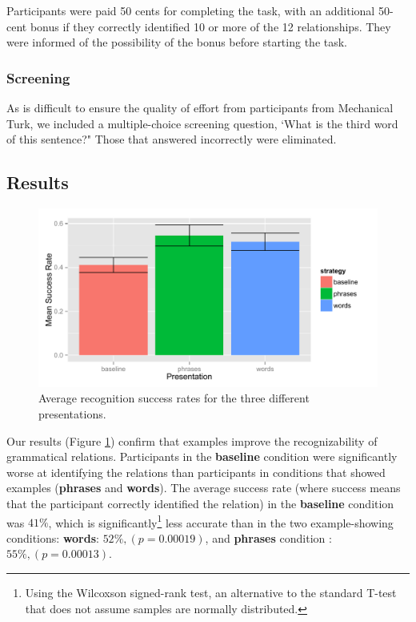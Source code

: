 \documentclass{sigchi}
\newcommand{\strong}[1] {\textbf{#1}}
\begin{document}
Participants were paid 50 cents for completing the task, with an additional 50-cent bonus if they correctly identified 10 or more of the 12 relationships. They were informed of the possibility of the bonus before starting the task.

\subsubsection{Screening}

As is difficult to ensure the quality of effort from participants from Mechanical Turk, we included a multiple-choice screening question, `What is the third word of this sentence?"  Those that answered incorrectly were eliminated.


\subsection{Results}
\begin{figure}
\includegraphics[width=1.0\columnwidth]{fig/overall-success-rates}
\caption{
	\label{fig:overall-success-rates} Average recognition success rates for the three different presentations.
}
\end{figure}
Our results (Figure \ref{fig:overall-success-rates}) confirm that examples improve the recognizability of grammatical relations. Participants in the \strong{baseline} condition were significantly worse at identifying the relations than participants in conditions that showed examples (\strong{phrases} and \strong{words}).  The average success rate (where success means that the participant correctly identified the relation) in the \strong{baseline} condition was $41\%$, which is significantly\footnote{Using the Wilcoxson signed-rank test, an alternative to the standard T-test that does not assume samples are normally distributed.} less accurate than in the two example-showing conditions: \strong{words}: $52\%, (p = 0.00019)$, and \strong{phrases} condition : $55\%, (p = 0.00013)$.
\end{document}
